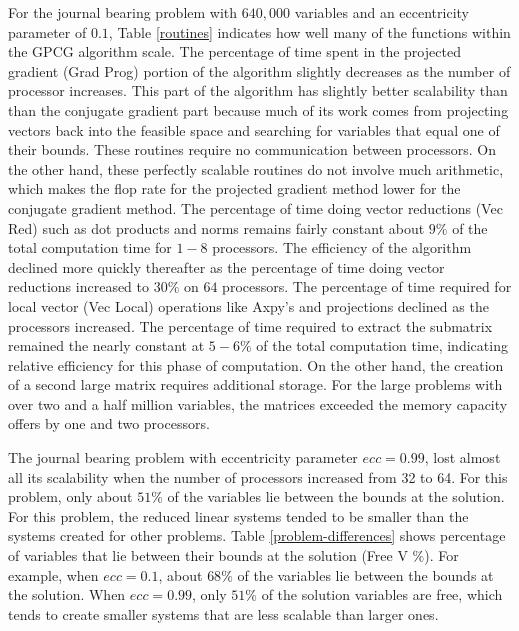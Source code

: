 For the journal bearing problem with $640,000$ variables and
an eccentricity parameter of $0.1$,
Table \ref{routines} indicates how well many of the functions within
the GPCG algorithm scale.
The percentage of time spent in the projected gradient (Grad Prog) portion of
the algorithm slightly decreases as the number of processor increases.
This part of the algorithm has slightly better scalability than
than the conjugate gradient part because
much of its work comes from projecting vectors back into the
feasible space and searching for variables that equal one of
their bounds.
These routines require no communication between processors.
On the other hand, these perfectly scalable routines
do not involve much arithmetic, which makes the flop rate
for the projected gradient method lower for the conjugate gradient method.
The percentage of time doing vector reductions (Vec Red) such as dot products
and norms remains fairly constant about $9\%$ of the total computation
time for $1-8$ processors.  The efficiency of the algorithm declined
more quickly thereafter as the percentage of time doing vector reductions
increased to $30\%$ on $64$ processors.  The percentage of time required
for local vector (Vec Local) operations like Axpy's and projections declined as
the processors increased.
The percentage of time
required to extract the submatrix remained the nearly constant
at $5-6\%$ of the total computation time, indicating relative efficiency for this
phase of computation.
On the other hand, the creation of a second large matrix requires
additional storage.  For the large problems with over two and a half million
variables, the matrices exceeded the memory capacity
offers by one and two  processors.

The journal bearing problem with eccentricity parameter
$ecc = 0.99$, lost almost all its scalability
when the number of processors increased from 32 to
64.  For this problem, only about $51\%$ of the variables
lie between the bounds at the solution.  For this problem, the
reduced linear systems tended to be smaller than the
systems created for other problems.  Table
\ref{problem-differences} shows percentage of variables that
lie between their bounds at the solution (Free V $\%$).
For example, when $ecc=0.1$,
about $68 \%$ of the variables lie between the bounds at the solution.
When $ecc=0.99$, only $51\%$ of the solution variables are free, which
tends to create smaller
systems that are less scalable than larger ones.

